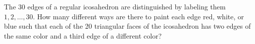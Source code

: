 The $30$ edges of a regular icosahedron are distinguished by labeling them $1,2,\dots,30.$ How many different ways are there to paint each edge red, white, or blue such that each of the 20 triangular faces of the icosahedron has two edges of the same color and a third edge of a different color?